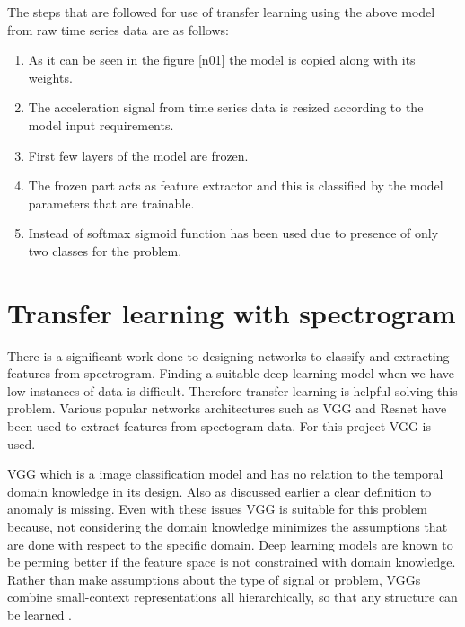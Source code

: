    The steps that are followed for use of transfer learning using the above model from raw time series data are as follows:
   \begin{enumerate} 
   	\item As it can be seen in the figure \ref{n01} the model is copied along with its weights.
   	\item The acceleration signal from time series data is resized according to the model input requirements. 
   	\item First few layers of the model are frozen.
   	\item The frozen part acts as feature extractor and this is classified by the model parameters that  are trainable.
   	\item Instead of softmax sigmoid function has been used due to presence of only two classes for the problem.
     \end{enumerate}  
   
 
   \section{Transfer learning with spectrogram}   
  There is a significant work done to designing networks to classify and extracting features from spectrogram. Finding a suitable deep-learning model when we have low instances of data is difficult. Therefore transfer learning is helpful solving this problem. Various popular networks architectures such as VGG and Resnet have been used to extract features from spectogram data. For this project VGG is used. 
  
  VGG which is a image classification model and has no relation to the temporal domain knowledge in its design. Also as discussed earlier a clear definition to anomaly is missing. Even with these issues VGG is suitable for this problem because, not considering the domain knowledge minimizes the assumptions that are done with respect to the specific domain. Deep learning models are known to be perming better if the feature space is not constrained with domain knowledge. Rather than make assumptions about the type of signal or problem, VGGs combine small-context representations all hierarchically, so that any structure can be learned \cite{vgg}. 
  
